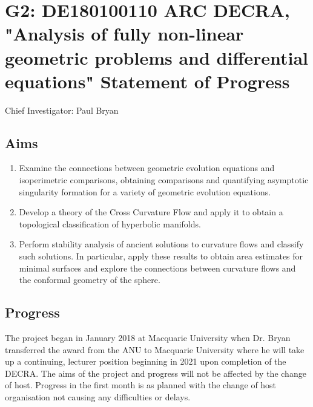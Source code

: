 \documentclass[12pt]{article}
\author{Paul Bryan}
\date{}
\title{}
\begin{document}
\section*{G2: DE180100110 ARC DECRA, "Analysis of fully non-linear geometric problems and differential equations" Statement of Progress}
\label{sec:org8a2b7e3}

Chief Investigator: Paul Bryan

\subsection*{Aims}
\label{sec:orgb6e580b}

\begin{enumerate}
\item Examine the connections between geometric evolution equations and isoperimetric comparisons, obtaining comparisons and quantifying asymptotic singularity formation for a variety of geometric evolution equations.

\item Develop a theory of the Cross Curvature Flow and apply it to obtain a topological classification of hyperbolic manifolds.

\item Perform stability analysis of ancient solutions to curvature flows and classify such solutions. In particular, apply these results to obtain area estimates for minimal surfaces and explore the connections between curvature flows and the conformal geometry of the sphere.
\end{enumerate}

\subsection*{Progress}
\label{sec:orgc7ba092}

The project began in January 2018 at Macquarie University when Dr. Bryan transferred the award from the ANU to Macquarie University where he will take up a continuing, lecturer position beginning in 2021 upon completion of the DECRA. The aims of the project and progress will not be affected by the change of host. Progress in the first month is as planned with the change of host organisation not causing any difficulties or delays.
\end{document}
